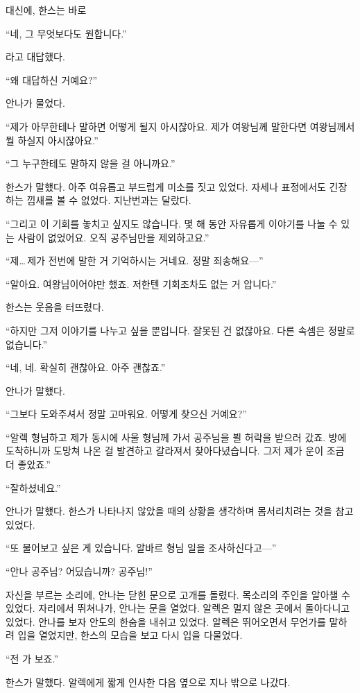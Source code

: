 대신에, 한스는 바로

``네, 그 무엇보다도 원합니다.''

라고 대답했다.

``왜 대답하신 거예요?''

안나가 물었다.

``제가 아무한테나 말하면 어떻게 될지 아시잖아요. 제가 여왕님께 말한다면 여왕님께서 뭘 하실지 아시잖아요.''

``그 누구한테도 말하지 않을 걸 아니까요.''

한스가 말했다. 아주 여유롭고 부드럽게 미소를 짓고 있었다. 자세나 표정에서도 긴장하는 낌새를 볼 수 없었다. 지난번과는 달랐다.

``그리고 이 기회를 놓치고 싶지도 않습니다. 몇 해 동안 자유롭게 이야기를 나눌 수 있는 사람이 없었어요. 오직 공주님만을 제외하고요.''

``제\ldots\,제가 전번에 말한 거 기억하시는 거네요. 정말 죄송해요—''

``알아요. 여왕님이어야만 했죠. 저한텐 기회조차도 없는 거 압니다.''

한스는 웃음을 터뜨렸다.

``하지만 그저 이야기를 나누고 싶을 뿐입니다. 잘못된 건 없잖아요. 다른 속셈은 정말로 없습니다.''

``네, 네. 확실히 괜찮아요. 아주 괜찮죠.''

안나가 말했다.

``그보다 도와주셔서 정말 고마워요. 어떻게 찾으신 거예요?''

``알렉 형님하고 제가 동시에 사울 형님께 가서 공주님을 뵐 허락을 받으러 갔죠. 방에 도착하니까 도망쳐 나온 걸 발견하고 갈라져서 찾아다녔습니다. 그저 제가 운이 조금 더 좋았죠.''

``잘하셨네요.''

안나가 말했다. 한스가 나타나지 않았을 때의 상황을 생각하며 몸서리치려는 것을 참고 있었다.

``또 물어보고 싶은 게 있습니다. 알바르 형님 일을 조사하신다고—''

``안나 공주님? 어딨습니까? 공주님!''

자신을 부르는 소리에, 안나는 닫힌 문으로 고개를 돌렸다. 목소리의 주인을 알아챌 수 있었다. 자리에서 뛰쳐나가, 안나는 문을 열었다. 알렉은 멀지 않은 곳에서 돌아다니고 있었다. 안나를 보자 안도의 한숨을 내쉬고 있었다. 알렉은 뛰어오면서 무언가를 말하려 입을 열었지만, 한스의 모습을 보고 다시 입을 다물었다.

``전 가 보죠.''

한스가 말했다. 알렉에게 짧게 인사한 다음 옆으로 지나 밖으로 나갔다.

